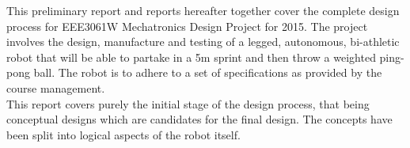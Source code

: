 \begin{homeworkProblem}[{Introduction}]
This preliminary report and reports hereafter together cover the complete design process for EEE3061W Mechatronics Design Project for 2015.  The project involves the design, manufacture and testing of a legged, autonomous, bi-athletic robot that will be able to partake in a 5m sprint and then throw a weighted ping-pong ball.  The robot is to adhere to a set of specifications as provided by the course management. \\

This report covers purely the initial stage of the design process, that being conceptual designs which are candidates for the final design.  The concepts have been split into logical aspects of the robot itself.



\end{homeworkProblem}
